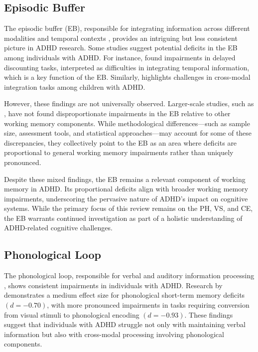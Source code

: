 \documentclass[stu]{apa7}
\begin{document}
\subsection{Episodic Buffer}

The episodic buffer (EB), responsible for integrating information across different modalities and temporal contexts \parencite{baddeley_developments_1994}, provides an intriguing but less consistent picture in ADHD research. Some studies suggest potential deficits in the EB among individuals with ADHD. For instance, \textcite{fabio_working_2020} found impairments in delayed discounting tasks, interpreted as difficulties in integrating temporal information, which is a key function of the EB. Similarly, \textcite{nyhout_episodic_2023} highlights challenges in cross-modal integration tasks among children with ADHD.

However, these findings are not universally observed. Larger-scale studies, such as \textcite{kofler_are_2018}, have not found disproportionate impairments in the EB relative to other working memory components. While methodological differences—such as sample size, assessment tools, and statistical approaches—may account for some of these discrepancies, they collectively point to the EB as an area where deficits are proportional to general working memory impairments rather than uniquely pronounced.

Despite these mixed findings, the EB remains a relevant component of working memory in ADHD. Its proportional deficits align with broader working memory impairments, underscoring the pervasive nature of ADHD's impact on cognitive systems. While the primary focus of this review remains on the PH, VS, and CE, the EB warrants continued investigation as part of a holistic understanding of ADHD-related cognitive challenges.

\subsection{Phonological Loop}

The phonological loop, responsible for verbal and auditory information processing \parencite{baddeley_developments_1994}, shows consistent impairments in individuals with ADHD. Research by \textcite{friedman_reading_2017} demonstrates a medium effect size for phonological short-term memory deficits \((d = -0.70)\), with more pronounced impairments in tasks requiring conversion from visual stimuli to phonological encoding \((d = -0.93)\). These findings suggest that individuals with ADHD struggle not only with maintaining verbal information but also with cross-modal processing involving phonological components.
\end{document}
